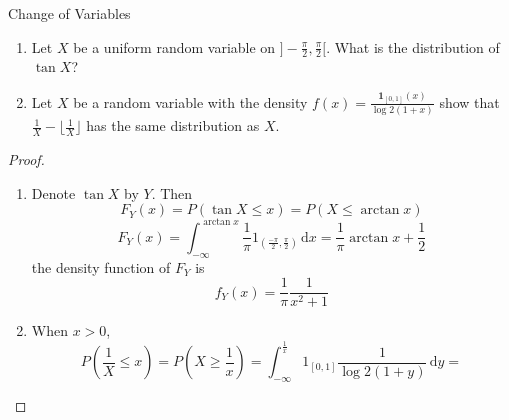\documentclass[../main.tex]{subfiles}
\begin{document}
\begin{exercise}{Change of Variables}{}
    
\begin{enumerate}
    \item Let $X$ be a uniform random variable on $]-\frac{\pi}{2}, \frac{\pi}{2}[$. What is the distribution of $\tan X$?
    \item Let $X$ be a random variable with the density $f(x) = \frac{\mathbf{1}_{[0,1]}(x)}{\log 2(1 + x)}$ show that $\frac{1}{X} - \lfloor \frac{1}{X} \rfloor$ has the same distribution as $X$.
\end{enumerate}
\end{exercise}
\begin{proof}
    \begin{enumerate}
        \item Denote \(  \tan  X  \) by \(  Y  \).  Then \[
        F_{Y}\left( x \right)= P\left( \tan X\le x \right)  = P\left( X\le \arctan x \right) 
        \]   \[
        F_{Y}\left( x \right)=  \int_{-\infty}^{\arctan x} \frac{1 }{ \pi } 1_{\left( \frac{- \pi }{2 }, \frac{ \pi }{2 }   \right) }\,\mathrm{d} x= \frac{1 }{ \pi } \arctan x+ \frac{1 }{2 }  
        \]the density function of \(  F_{Y}  \) is \[
        f_{Y}\left( x \right)= \frac{1 }{ \pi }\frac{1 }{x^{2}+ 1 }   
        \] 
        \item When \(  x> 0  \),   \[
        P\left( \frac{1 }{X }  \le x\right)=  P \left( X\ge \frac{1 }{x }  \right) =  \int_{-\infty}^{\frac{1 }{x } } 1_{\left[ 0,1 \right] } \frac{1 }{\log 2\left( 1+y \right)  }\,\mathrm{d} y=  
        \]
    \end{enumerate}
    
\end{proof}
\end{document}
